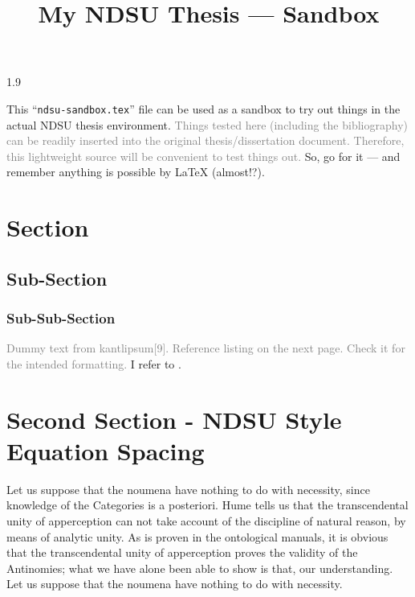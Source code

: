 \documentclass[12pt,chapterrefs,showgrid]{ndsu-thesis-2022}
\title{My NDSU Thesis --- Sandbox}
\newcommand\myspacing{1.9} %
\begin{document}
\begin{spacing}{\myspacing}      %


This ``\texttt{ndsu-sandbox.tex}'' file can be used as a sandbox to try out things in the actual NDSU thesis environment. \textcolor{gray}{Things tested here (including the bibliography) can be readily inserted into the original thesis/dissertation document. Therefore, this lightweight source will be convenient to test things out.} So, go for it --- and remember anything is possible by \LaTeX{} (almost!?).

\section{Section}
\subsection{Sub-Section}
\subsubsection{Sub-Sub-Section}

\textcolor{gray}{Dummy text from kantlipsum[9]. Reference listing on the next page. Check it for the intended formatting.} I refer to \citep{lamport94,kopka2004guide,baczkowski1990ndsu,cassuto2010advising,pires2021teens}. \kant[9]



\section{Second Section - NDSU Style Equation Spacing}

Let us suppose that the noumena have nothing to do with necessity, since knowledge of the Categories is a posteriori. Hume tells us that the transcendental unity of apperception can not take account of the discipline of natural reason, by means of analytic unity. As is proven in the ontological manuals, it is obvious that the transcendental unity of apperception proves the validity of the Antinomies; what we have alone been able to show is that, our understanding. Let us suppose that the noumena have nothing to do with necessity.


\end{spacing}
\end{document}
